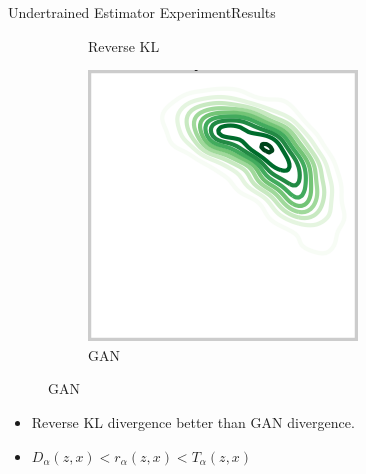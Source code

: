 \documentclass[handout]{beamer}
\begin{document}
\begin{frame}{Undertrained Estimator Experiment}{Results}
\begin{figure}[h!]
\begin{subfigure}{0.3\textwidth}
\caption*{\small Reverse KL}
\end{subfigure}
\begin{subfigure}{0.3\textwidth}
\centering
\includegraphics[width=0.5\linewidth]{14081a.png}
\caption*{\small GAN}
\end{subfigure}
\end{figure}
\begin{itemize}
\item Reverse KL divergence better than GAN divergence.
\item $D_\alpha(z,x)<r_\alpha(z,x)<T_\alpha(z,x)$
\end{itemize}
\end{frame}
\end{document}
